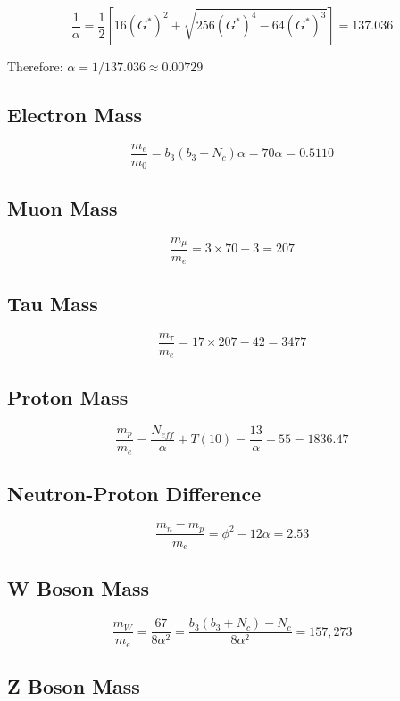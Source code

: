 \documentclass[
  11pt,
  letterpaper,
  twoside,
  openright]{book}
\begin{document}
\[
\frac{1}{\alpha} = \frac{1}{2}\left[16(G^*)^2 + \sqrt{256(G^*)^4 - 64(G^*)^3}\right] = 137.036
\]

Therefore: \(\alpha = 1/137.036 \approx 0.00729\)

\subsection{Electron Mass}\label{electron-mass}

\[
\frac{m_e}{m_0} = b_3(b_3 + N_c)\alpha = 70\alpha = 0.5110
\]

\subsection{Muon Mass}\label{muon-mass}

\[
\frac{m_\mu}{m_e} = 3 \times 70 - 3 = 207
\]

\subsection{Tau Mass}\label{tau-mass}

\[
\frac{m_\tau}{m_e} = 17 \times 207 - 42 = 3477
\]

\subsection{Proton Mass}\label{proton-mass}

\[
\frac{m_p}{m_e} = \frac{N_{eff}}{\alpha} + T(10) = \frac{13}{\alpha} + 55 = 1836.47
\]

\subsection{Neutron-Proton Difference}\label{neutron-proton-difference}

\[
\frac{m_n - m_p}{m_e} = \phi^2 - 12\alpha = 2.53
\]

\subsection{W Boson Mass}\label{w-boson-mass}

\[
\frac{m_W}{m_e} = \frac{67}{8\alpha^2} = \frac{b_3(b_3+N_c) - N_c}{8\alpha^2} = 157{,}273
\]

\subsection{Z Boson Mass}\label{z-boson-mass}
\end{document}
